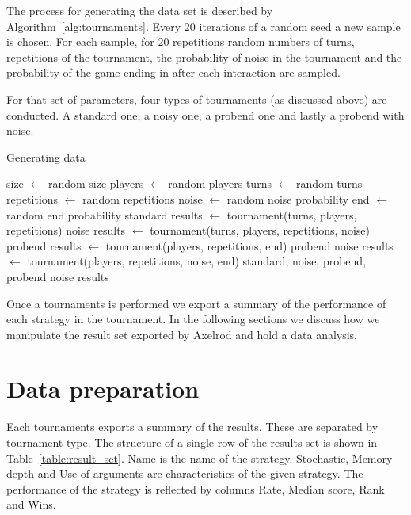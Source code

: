 \documentclass{article}
\begin{document}
The process for generating the data set is described by Algorithm~\ref{alg:tournaments}.
Every 20 iterations of a random seed a new sample is chosen. For each sample, for 20
repetitions random numbers of turns, repetitions of the tournament, the probability of
noise in the tournament and the probability of the game ending in after each interaction
are sampled.

For that set of parameters, four types of tournaments (as discussed above) are conducted.
A standard one, a noisy one, a probend one and lastly a probend with noise.

\begin{algorithm}
    \caption{Generating data}
    \label{alg:tournaments}
      \begin{algorithmic}[1]
                \STATE size $\gets$ random  size
                \STATE players $\gets$ random players
             \ELSE
                 \STATE turns $\gets$ random turns
                 \STATE repetitions  $\gets$  random  repetitions
                 \STATE noise  $\gets$ random  noise  probability
                 \STATE end  $\gets$  random end probability
                 \STATE standard results $\gets$ tournament(turns, players, repetitions) 
                 \STATE noise results $\gets$ tournament(turns, players, repetitions, noise)
                 \STATE probend results $\gets$ tournament(players, repetitions, end)
                 \STATE probend noise results $\gets$ tournament(players, repetitions, noise, end)
             \ENDIF
             \RETURN standard, noise, probend, probend noise results
        \ENDFOR
      \end{algorithmic}
\end{algorithm}

Once a tournaments is performed we export a summary of the performance
of each strategy in the tournament. In the following sections we discuss how we
manipulate the result set exported by Axelrod and hold a data analysis.

\section{Data preparation}

Each tournaments exports a summary of the results. These are separated by tournament
type. The structure of a single row of the results set is shown in
Table~\ref{table:result_set}. Name is the name of the strategy. Stochastic,
Memory depth and Use of arguments are characteristics of the given strategy.
The performance of the strategy is reflected by columns Rate, Median score, Rank and Wins.
\end{document}
